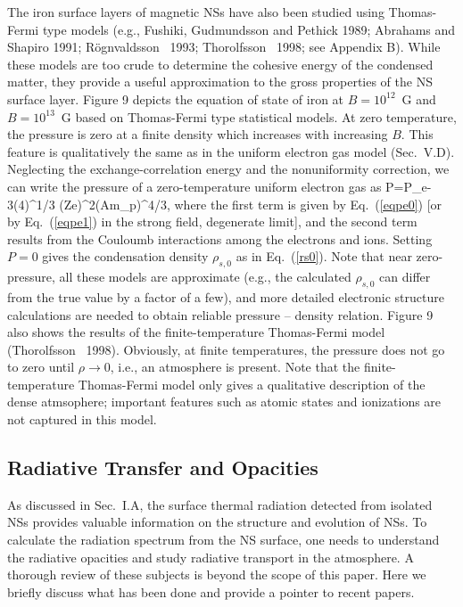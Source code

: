The iron surface layers of magnetic NSs have also been studied
using Thomas-Fermi type models (e.g., Fushiki, Gudmundsson and Pethick 
1989; Abrahams and Shapiro 1991; R\"ognvaldsson \etal~1993; 
Thorolfsson \etal~1998; see Appendix B). While these models are too crude to 
determine the cohesive energy of the condensed matter, they provide 
a useful approximation to the gross properties of the NS surface layer.
Figure 9 depicts the equation of
state of iron at $B=10^{12}$~G and $B=10^{13}$~G based on Thomas-Fermi
type statistical models. At zero temperature, the pressure is zero 
at a finite density which increases with increasing $B$. 
This feature is qualitatively the same as in the uniform electron gas 
model (Sec.~V.D). Neglecting the exchange-correlation energy and 
the nonuniformity correction, we can write the pressure of a zero-temperature
uniform electron gas as
\be
P=P_e-{3}\left({4\pi{}}\right)^{1/3}\!\!\!\!
(Ze)^2\!\left({\rho\over Am_p}\right)^{4/3},
\label{puniform}\ee
where the first term is given by Eq.~(\ref{eqpe0}) [or by 
Eq.~(\ref{eqpe1}) in the strong field, degenerate limit],
and the second term results from the Couloumb interactions among the 
electrons and ions. Setting $P=0$ gives the condensation density
$\rho_{s,0}$ as in Eq.~(\ref{rs0}). Note that near zero-pressure,
all these models are approximate (e.g., the calculated 
$\rho_{s,0}$ can differ from the true value by a factor of a few), and more
detailed electronic structure calculations are needed to obtain
reliable pressure -- density relation. Figure 9 also shows
the results of the finite-temperature Thomas-Fermi model
(Thorolfsson \etal~1998). Obviously, at finite temperatures, the pressure
does not go to zero until $\rho\rightarrow 0$, i.e., an atmosphere is
present. Note that the finite-temperature Thomas-Fermi
model only gives a qualitative description of the dense 
atmsophere; important features such as atomic states and
ionizations are not captured in this model.


\subsection{Radiative Transfer and Opacities}

As discussed in Sec.~I.A, the surface thermal radiation 
detected from isolated NSs provides valuable information
on the structure and evolution of NSs.
To calculate the radiation spectrum from the NS surface,
one needs to understand the radiative opacities and study
radiative transport in the atmosphere. A thorough review
of these subjects is beyond the scope of this paper. Here we briefly
discuss what has been done and provide a pointer to recent papers.

